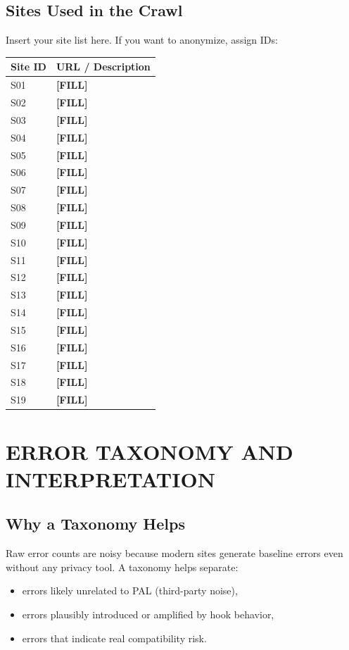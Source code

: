 \documentclass[11pt]{report}
\begin{document}
\section{Sites Used in the Crawl}

Insert your site list here. If you want to anonymize, assign IDs:

\begin{longtable}{p{} p{}}
\toprule
\textbf{Site ID} & \textbf{URL / Description} \\
\midrule
S01 & \textbf{[FILL]} \\
S02 & \textbf{[FILL]} \\
S03 & \textbf{[FILL]} \\
S04 & \textbf{[FILL]} \\
S05 & \textbf{[FILL]} \\
S06 & \textbf{[FILL]} \\
S07 & \textbf{[FILL]} \\
S08 & \textbf{[FILL]} \\
S09 & \textbf{[FILL]} \\
S10 & \textbf{[FILL]} \\
S11 & \textbf{[FILL]} \\
S12 & \textbf{[FILL]} \\
S13 & \textbf{[FILL]} \\
S14 & \textbf{[FILL]} \\
S15 & \textbf{[FILL]} \\
S16 & \textbf{[FILL]} \\
S17 & \textbf{[FILL]} \\
S18 & \textbf{[FILL]} \\
S19 & \textbf{[FILL]} \\
\bottomrule
\end{longtable}

\chapter{ERROR TAXONOMY AND INTERPRETATION}

\section{Why a Taxonomy Helps}

Raw error counts are noisy because modern sites generate baseline errors even without any privacy tool. A taxonomy helps separate:

\begin{itemize}
    \item errors likely unrelated to PAL (third-party noise),
    \item errors plausibly introduced or amplified by hook behavior,
    \item errors that indicate real compatibility risk.
\end{itemize}
\end{document}
